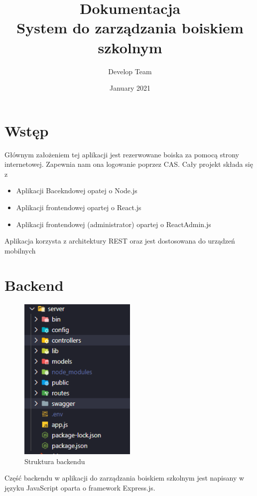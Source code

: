 \documentclass[titlepage]{article}
\title{
  \textbf{Dokumentacja} \\
  System do zarządzania boiskiem szkolnym}
\date{January 2021}
\author{Develop Team}
\begin{document}
\maketitle
\tableofcontents
\section*{Wstęp}

Głównym założeniem tej aplikacji jest rezerwowane boiska za pomocą strony internetowej. Zapewnia nam ona logowanie poprzez CAS. Cały projekt składa się z 
\begin{itemize}
  \item Aplikacji Bacekndowej opatej o Node.js
  \item Aplikacji frontendowej opartej o React.js
  \item Aplikacji frontendowej (administrator) opartej o ReactAdmin.js
\end{itemize}

Aplikacja korzysta z architektury REST oraz jest dostosowana do urządzeń mobilnych

\newpage
\section{Backend}

\begin{figure}[h]
\centering
\includegraphics[width=0.5\textwidth]{struktura.png}
\caption{Struktura backendu}
\label{fig:obrazek struktura}
\end{figure}

\indent Część backendu w aplikacji do zarządzania boiskiem szkolnym jest napisany w języku JavaScript oparta o framework Express.js.
\end{document}
